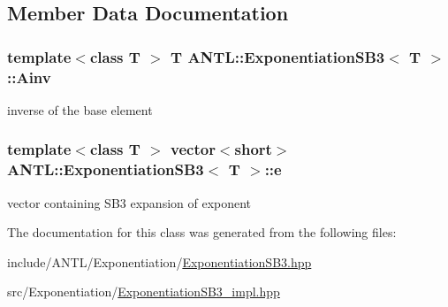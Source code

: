 \subsection{Member Data Documentation}
\hypertarget{classANTL_1_1ExponentiationSB3_a6a63a05ea88cc09a53640aad0fca0be1}{
\subsubsection[{Ainv}]{\setlength{\rightskip}{0pt plus 5cm}template$<$class T $>$ T {\bf A\-N\-T\-L\-::\-Exponentiation\-S\-B3}$<$ T $>$\-::Ainv\hspace{0.3cm}{\ttfamily [protected]}}}\label{classANTL_1_1ExponentiationSB3_a6a63a05ea88cc09a53640aad0fca0be1}
inverse of the base element \hypertarget{classANTL_1_1ExponentiationSB3_a0e535891fd8fa5e406fd9ac080ea1ee9}{
\subsubsection[{e}]{\setlength{\rightskip}{0pt plus 5cm}template$<$class T $>$ vector$<$short$>$ {\bf A\-N\-T\-L\-::\-Exponentiation\-S\-B3}$<$ T $>$\-::e\hspace{0.3cm}{\ttfamily [protected]}}}\label{classANTL_1_1ExponentiationSB3_a0e535891fd8fa5e406fd9ac080ea1ee9}
vector containing S\-B3 expansion of exponent 

The documentation for this class was generated from the following files\-:\begin{DoxyCompactItemize}
\item 
include/\-A\-N\-T\-L/\-Exponentiation/\hyperlink{ExponentiationSB3_8hpp}{Exponentiation\-S\-B3.\-hpp}\item 
src/\-Exponentiation/\hyperlink{ExponentiationSB3__impl_8hpp}{Exponentiation\-S\-B3\-\_\-impl.\-hpp}\end{DoxyCompactItemize}
